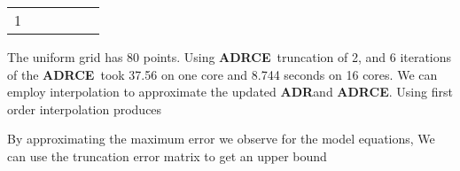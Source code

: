 \documentclass[12pt]{article}
\newcommand{\ADRCE}{{\bf ADRCE}}
\newcommand{\ADR}{{\bf ADR}}
\begin{document}
\begin{longtable}{|c|r|r|r|r|r|}
\hline

\hline

\hline

\hline

\hline

\hline

\hline

\hline

\hline

\hline

\hline

\hline

\hline

\hline

\hline

\hline

\hline

\hline

\hline

\hline

\hline

\hline1

\hline
%
\end{longtable}






The uniform grid has 80 points.
Using  \ADRCE\ truncation of 2, and 6 iterations of the \ADRCE\ took
37.56 on one core and 8.744 seconds on 16 cores.
We can employ interpolation to approximate the updated \ADR and \ADRCE.  
Using first order interpolation produces 

By approximating the maximum error we observe for the model equations,
We can use the truncation error matrix to get an upper bound









\end{document}
